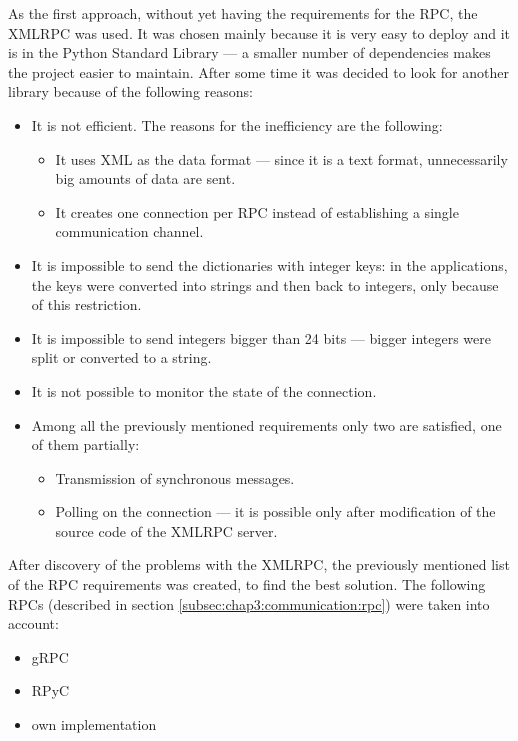     As the first approach, without yet having the requirements for the RPC, the XMLRPC was used. It was chosen mainly because it is very easy to deploy and it is in the Python Standard Library --- a smaller number of dependencies makes the project easier to maintain.
    After some time it was decided to look for another library because of the following reasons:
    \begin{itemize}
        \item It is not efficient. The reasons for the inefficiency are the following:
        \begin{itemize}
            \item It uses XML as the data format --- since it is a text format, unnecessarily big amounts of data are sent.
            \item It creates one connection per RPC instead of establishing a single communication channel.
        \end{itemize}
        \item It is impossible to send the dictionaries with integer keys: in the applications, the keys were converted into strings and then back to integers, only because of this restriction.
        \item It is impossible to send integers bigger than 24 bits --- bigger integers were split or converted to a string.
        \item It is not possible to monitor the state of the connection.
        \item Among all the previously mentioned requirements only two are satisfied, one of them partially:
        \begin{itemize}
            \item Transmission of synchronous messages.
            \item Polling on the connection --- it is possible only after modification of the source code of the XMLRPC server.
        \end{itemize}
    \end{itemize}
    
    After discovery of the problems with the XMLRPC, the previously mentioned list of the RPC requirements was created, to find the best solution. The following RPCs (described in section \ref{subsec:chap3:communication:rpc}) were taken into account:
    \begin{itemize}
        \item gRPC
        \item RPyC
        \item own implementation
    \end{itemize}
    
